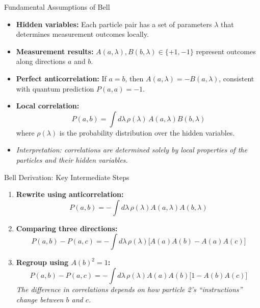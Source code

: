 \begin{frame}{Fundamental Assumptions of Bell}

\begin{itemize}
  \item \textbf{Hidden variables:} Each particle pair has a set of parameters $\lambda$ that determines measurement outcomes locally. \pause
  \item \textbf{Measurement results:} $A(a,\lambda), B(b,\lambda) \in \{+1,-1\}$ represent outcomes along directions $a$ and $b$. \pause
  \item \textbf{Perfect anticorrelation:} If $a=b$, then $A(a,\lambda) = -B(a,\lambda)$, consistent with quantum prediction $P(a,a)=-1$. \pause
  \item \textbf{Local correlation:} 
  \[
    P(a,b) = \int d\lambda\, \rho(\lambda)\, A(a,\lambda) B(b,\lambda)
  \]
  where $\rho(\lambda)$ is the probability distribution over the hidden variables. \pause
  \item \textit{Interpretation: correlations are determined solely by local properties of the particles and their hidden variables.}
\end{itemize}

\end{frame}

\begin{frame}{Bell Derivation: Key Intermediate Steps}

\begin{enumerate}
  \item \textbf{Rewrite using anticorrelation:}  
  \[
    P(a,b) = - \int d\lambda\, \rho(\lambda) A(a,\lambda) A(b,\lambda)
  \]

  \item \textbf{Comparing three directions:}  
  \[
    P(a,b)-P(a,c) = - \int d\lambda\, \rho(\lambda) \big[ A(a)A(b) - A(a)A(c) \big]
  \] \pause

  \item \textbf{Regroup using $A(b)^2=1$:}  
  \[
    P(a,b)-P(a,c) = - \int d\lambda\, \rho(\lambda) A(a)A(b) \big[ 1 - A(b)A(c) \big]
  \] 
  \textit{The difference in correlations depends on how particle 2’s “instructions” change between $b$ and $c$.}
\end{enumerate}

\end{frame}

